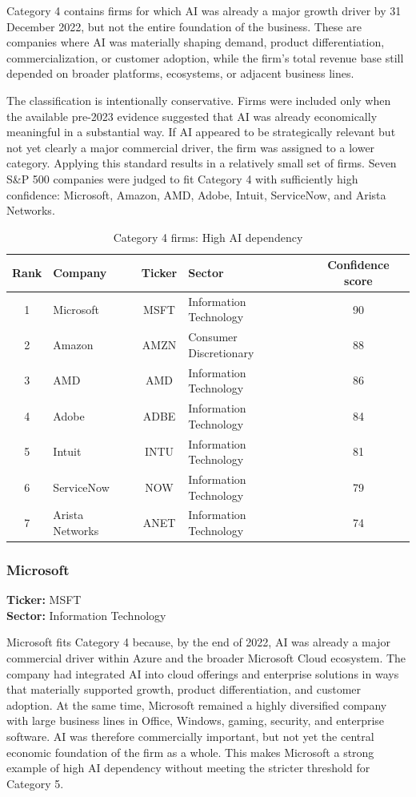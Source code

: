 \documentclass{article}
\begin{document}
Category 4 contains firms for which AI was already a major growth driver by 31 December 2022, but not the entire foundation of the business. These are companies where AI was materially shaping demand, product differentiation, commercialization, or customer adoption, while the firm’s total revenue base still depended on broader platforms, ecosystems, or adjacent business lines.

The classification is intentionally conservative. Firms were included only when the available pre-2023 evidence suggested that AI was already economically meaningful in a substantial way. If AI appeared to be strategically relevant but not yet clearly a major commercial driver, the firm was assigned to a lower category. Applying this standard results in a relatively small set of firms. Seven S\&P 500 companies were judged to fit Category 4 with sufficiently high confidence: Microsoft, Amazon, AMD, Adobe, Intuit, ServiceNow, and Arista Networks.

\begin{table}[H]
\centering
\caption{Category 4 firms: High AI dependency}
\begin{tabular}{|c|l|c|l|c|}
\hline
\textbf{Rank} & \textbf{Company} & \textbf{Ticker} & \textbf{Sector} & \textbf{Confidence score} \\ \hline
1 & Microsoft & MSFT & Information Technology & 90 \\ \hline
2 & Amazon & AMZN & Consumer Discretionary & 88 \\ \hline
3 & AMD & AMD & Information Technology & 86 \\ \hline
4 & Adobe & ADBE & Information Technology & 84 \\ \hline
5 & Intuit & INTU & Information Technology & 81 \\ \hline
6 & ServiceNow & NOW & Information Technology & 79 \\ \hline
7 & Arista Networks & ANET & Information Technology & 74 \\ \hline
\end{tabular}
\label{tab:category4}
\end{table}

\subsubsection*{Microsoft}
\textbf{Ticker:} MSFT \\
\textbf{Sector:} Information Technology

Microsoft fits Category 4 because, by the end of 2022, AI was already a major commercial driver within Azure and the broader Microsoft Cloud ecosystem. The company had integrated AI into cloud offerings and enterprise solutions in ways that materially supported growth, product differentiation, and customer adoption. At the same time, Microsoft remained a highly diversified company with large business lines in Office, Windows, gaming, security, and enterprise software. AI was therefore commercially important, but not yet the central economic foundation of the firm as a whole. This makes Microsoft a strong example of high AI dependency without meeting the stricter threshold for Category 5.
\end{document}
